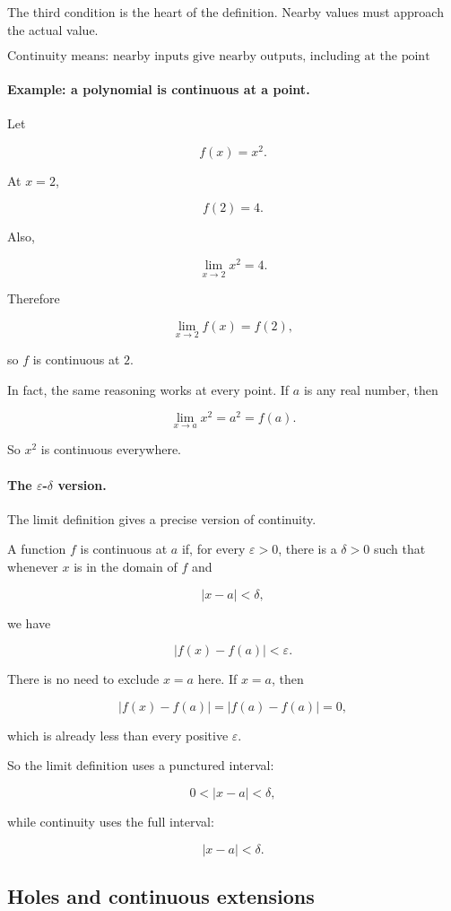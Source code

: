 The third condition is the heart of the definition.  Nearby values must approach the actual value.

\[
\boxed{
\text{Continuity means: nearby inputs give nearby outputs, including at the point itself.}
}
\]

\paragraph{Example: a polynomial is continuous at a point.}
Let

\[
f(x)=x^2.
\]

At \(x=2\),

\[
f(2)=4.
\]

Also,

\[
\lim_{x\to2}x^2=4.
\]

Therefore

\[
\lim_{x\to2}f(x)=f(2),
\]

so \(f\) is continuous at \(2\).

In fact, the same reasoning works at every point.  If \(a\) is any real number, then

\[
\lim_{x\to a}x^2=a^2=f(a).
\]

So \(x^2\) is continuous everywhere.

\paragraph{The \(\varepsilon\)-\(\delta\) version.}
The limit definition gives a precise version of continuity.

A function \(f\) is continuous at \(a\) if, for every \(\varepsilon>0\), there is a \(\delta>0\) such that whenever \(x\) is in the domain of \(f\) and

\[
|x-a|<\delta,
\]

we have

\[
|f(x)-f(a)|<\varepsilon.
\]

There is no need to exclude \(x=a\) here.  If \(x=a\), then

\[
|f(x)-f(a)|=|f(a)-f(a)|=0,
\]

which is already less than every positive \(\varepsilon\).

So the limit definition uses a punctured interval:

\[
0<|x-a|<\delta,
\]

while continuity uses the full interval:

\[
|x-a|<\delta.
\]

\subsection{Holes and continuous extensions}
\label{subsec:holes-continuous-extensions}


